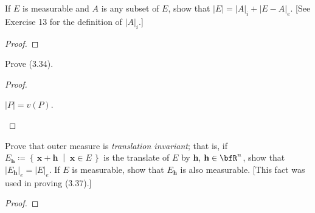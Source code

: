 \begin{problem}
If $E$ is measurable and $A$ is any subset of $E$, show that
$\left|E\right|=\left|A\right|_i+\left|E\minus A\right|_e$. [See Exercise
13 for the definition of $\left|A\right|_i$.]
\end{problem}
\begin{proof}
\end{proof}
\newpage

\begin{problem}
Prove (3.34).
\end{problem}
\begin{proof}
\begin{lemma*}
$\left|P\right|=v(P)$.
\end{lemma*}
\end{proof}
\newpage

\begin{problem}
Prove that outer measure is \emph{translation invariant}; that is, if
$E_{\textbf{h}}\coloneqq\left\{\,\mathbf{x}+\mathbf{h}\;\middle|\;\mathbf{x}\in
  E\,\right\}$ is the translate of $E$ by $\mathbf{h}$,
$\mathbf{h}\in\bfR^n$, show that
$\left|E_{\mathbf{h}}\right|_e=\left|E\right|_e$. If $E$ is measurable,
show that $E_{\mathbf{h}}$ is also measurable. [This fact was used in
proving (3.37).]
\end{problem}
\begin{proof}
\end{proof}

